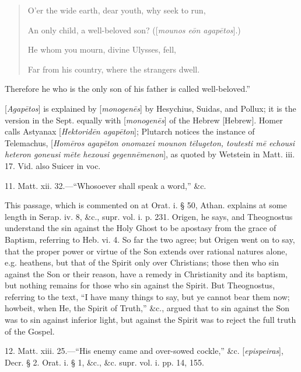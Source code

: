 \begin{quote}

O'er the wide earth, dear youth,
why seek to run,

An only child, a well-beloved son? ([\emph{mounos e\={o}n agap\={e}tos}].)

He whom you mourn, divine Ulysses, fell,

Far from his country, where the strangers dwell.

\end{quote}

Therefore he who is the only son of his father is
called well-beloved.''

[\emph{Agap\={e}tos}] is explained by [\emph{monogen\={e}s}]
by Hesychius, Suidas, and Pollux; it is the version in the Sept.
equally with [\emph{monogen\={e}s}] of the Hebrew [Hebrew].
Homer calls Astyanax [\emph{Hektorid\={e}n agap\={e}ton}];
Plutarch notices the instance of Telemachus, [\emph{Hom\={e}ros agap\={e}ton
onomazei mounon t\={e}lugeton, toutesti m\={e} echousi heteron
goneusi m\={e}te hexousi gegenn\={e}menon}], as quoted by
Wetstein in Matt. iii. 17. Vid. also Suicer in voc.

11. Matt. xii. 32.—``Whosoever shall speak a
word,'' \&c.

This passage, which is commented on at Orat. i.
§ 50, Athan. explains at some length in Serap. iv. 8, \&c., supr.
vol. i. p. 231. Origen, he says, and Theognostus understand the sin
against the Holy Ghost to be apostasy from the grace of Baptism,
referring to Heb. vi. 4. So far the two agree; but Origen went on to
say, that the proper power or virtue of the Son extends over rational
natures alone, e.g. heathens, but that of the Spirit only over
Christians; those then who sin against the Son or their reason, have a
remedy in Christianity and its baptism, but nothing remains for those who sin against the Spirit. But Theognostus, referring to the
text, ``I have many things to say, but ye cannot bear them now;
howbeit, when He, the Spirit of Truth,'' \&c., argued that to sin
against the Son was to sin against inferior light, but against the
Spirit was to reject the full truth of the Gospel.

12. Matt. xiii. 25.—``His enemy came and
over-sowed cockle,'' \&c. [\emph{epispeiras}], Decr. § 2. Orat. i.
§ 1, \&c., \&c. supr. vol. i. pp. 14, 155.

